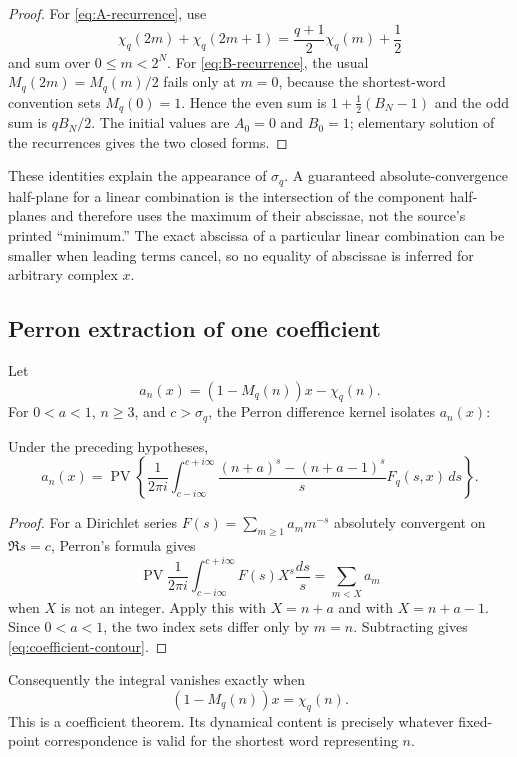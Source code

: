 \begin{proof}
For \cref{eq:A-recurrence}, use
\[
 \chi_q(2m)+\chi_q(2m+1)
 =\frac{q+1}{2}\chi_q(m)+\frac12
\]
and sum over $0\leq m<2^N$.  For \cref{eq:B-recurrence}, the usual
$M_q(2m)=M_q(m)/2$ fails only at $m=0$, because the shortest-word convention
sets $M_q(0)=1$.  Hence the even sum is
$1+\frac12(B_N-1)$ and the odd sum is $qB_N/2$.  The initial values are
$A_0=0$ and $B_0=1$; elementary solution of the recurrences gives the two
closed forms.
\end{proof}

These identities explain the appearance of $\sigma_q$.  A guaranteed
absolute-convergence half-plane for a linear combination is the intersection
of the component half-planes and therefore uses the maximum of their
abscissae, not the source's printed ``minimum.''  The exact abscissa of a
particular linear combination can be smaller when leading terms cancel, so
no equality of abscissae is inferred for arbitrary complex $x$.

\subsection{Perron extraction of one coefficient}

Let
\[
 a_n(x)=(1-M_q(n))x-\chi_q(n).
\]
For $0<a<1$, $n\geq3$, and $c>\sigma_q$, the Perron difference kernel
isolates $a_n(x)$:
\begin{theorem}
\label{thm:coefficient-contour}
Under the preceding hypotheses,
\begin{equation}
\label{eq:coefficient-contour}
 a_n(x)=\operatorname{PV}\left\{
 \frac1{2\pi i}\int_{c-i\infty}^{c+i\infty}
 \frac{(n+a)^s-(n+a-1)^s}{s}F_q(s,x)\,ds
 \right\}.
\end{equation}
\end{theorem}

\begin{proof}
For a Dirichlet series $F(s)=\sum_{m\geq1}a_mm^{-s}$ absolutely convergent
on $\Re s=c$, Perron's formula gives
\[
 \operatorname{PV}\frac1{2\pi i}
 \int_{c-i\infty}^{c+i\infty}F(s)X^s\frac{ds}{s}
 =\sum_{m<X}a_m
\]
when $X$ is not an integer.  Apply this with $X=n+a$ and with
$X=n+a-1$.  Since $0<a<1$, the two index sets differ only by $m=n$.
Subtracting gives \cref{eq:coefficient-contour}.
\end{proof}

Consequently the integral vanishes exactly when
\begin{equation}
\label{eq:contour-fixed-numerator}
 (1-M_q(n))x=\chi_q(n).
\end{equation}
This is a coefficient theorem.  Its dynamical content is precisely whatever
fixed-point correspondence is valid for the shortest word representing
$n$.

